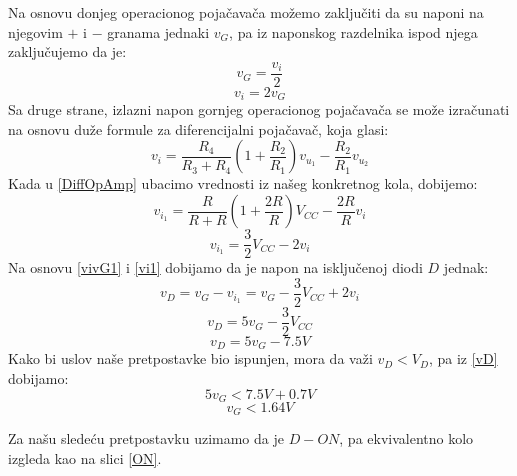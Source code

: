 \documentclass{article}
\begin{document}
\begin{enumerate}[itemsep=\baselineskip]
        Na osnovu donjeg operacionog pojačavača možemo zaključiti da su naponi na njegovim $+$ i $-$ granama jednaki $v_G$, pa iz naponskog razdelnika ispod njega zaključujemo da je:
        $$v_G = \frac{v_i}{2}$$
        \begin{equation}
            \label{vivG1}
            \boxed{v_i = 2v_G}
        \end{equation}
        Sa druge strane, izlazni napon gornjeg operacionog pojačavača se može izračunati na osnovu duže formule za diferencijalni pojačavač, koja glasi:
        \begin{equation}
            \label{DiffOpAmp}
            v_i = \frac{R_4}{R_3 + R_4}(1 + \frac{R_2}{R_1})v_{u_1} - \frac{R_2}{R_1}v_{u_2}
        \end{equation}
        Kada u \eqref{DiffOpAmp} ubacimo vrednosti iz našeg konkretnog kola, dobijemo:
        $$v_{i_1} = \frac{R}{R + R}(1 + \frac{2R}{R})V_{CC} - \frac{2R}{R}v_i$$
        \begin{equation}
            \label{vi1}
            v_{i_1} = \frac{3}{2}V_{CC} - 2v_i
        \end{equation}
        Na osnovu \eqref{vivG1} i \eqref{vi1} dobijamo da je napon na isključenoj diodi $D$ jednak:
        $$v_D = v_G - v_{i_1} = v_G - \frac{3}{2}V_{CC} + 2v_i$$
        $$v_D = 5v_G - \frac{3}{2}V_{CC}$$
        \begin{equation}
            \label{vD}
            v_D = 5v_G - 7.5V
        \end{equation}
        Kako bi uslov naše pretpostavke bio ispunjen, mora da važi $v_D < V_D$, pa iz \eqref{vD} dobijamo:
        $$5v_G < 7.5V + 0.7V$$
        \begin{equation}
            \label{Uslov1}
            v_G < 1.64V
        \end{equation}

        Za našu sledeću pretpostavku uzimamo da je $D-ON$, pa ekvivalentno kolo izgleda kao na slici \ref{ON}.


\end{enumerate}
\end{document}
